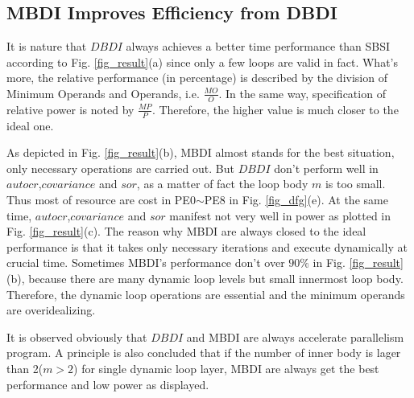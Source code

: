 \documentclass[10pt, conference, compsocconf]{IEEEtran}
\begin{document}
%
%

\subsection{MBDI Improves Efficiency from DBDI}
It is nature that $DBDI$ always achieves a better time performance than SBSI according to Fig. \ref{fig_result}(a) since only a few loops are valid in fact. What's more, the relative performance (in percentage) is described by the division of Minimum Operands and Operands, i.e. $\frac{MO}{O}$. In the same way, specification of relative power is noted by $\frac{MP}{P}$. Therefore, the higher value is much closer to the ideal one.

%
As depicted in Fig. \ref{fig_result}(b), MBDI almost stands for the best situation, only necessary operations are carried out. But $DBDI$ don't perform well in $autocr$,$covariance$ and $sor$, as a matter of fact the loop body $m$ is too small. Thus most of resource are cost in PE0$\sim$PE8 in Fig. \ref{fig_dfg}(e). At the same time, $autocr$,$covariance$ and $sor$ manifest not very well in power as plotted in Fig. \ref{fig_result}(c). The reason why MBDI are always closed to the ideal performance is that it takes only necessary iterations and execute dynamically at crucial time. Sometimes MBDI's performance don't over $90\%$ in Fig. \ref{fig_result}(b), because there are many dynamic loop levels but small innermost loop body. Therefore, the dynamic loop operations are essential and the minimum operands are overidealizing.

It is observed obviously that $DBDI$ and MBDI are always accelerate parallelism program. A principle is also concluded that if the number of inner body is lager than 2($m>2$) for single dynamic loop layer, MBDI are always get the best performance and low power as displayed.


%
%
\end{document}
